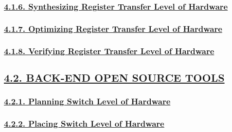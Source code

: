 \documentclass[
]{article}
\begin{document}
\hypertarget{synthesizing-register-transfer-level-of-hardware}{%
\subsubsection{\texorpdfstring{\protect\hyperlink{synthesizing-register-transfer-level-of-hardware-1}{4.1.6.
Synthesizing Register Transfer Level of
Hardware}}{4.1.6. Synthesizing Register Transfer Level of Hardware}}\label{synthesizing-register-transfer-level-of-hardware}}

\hypertarget{optimizing-register-transfer-level-of-hardware}{%
\subsubsection{\texorpdfstring{\protect\hyperlink{optimizing-register-transfer-level-of-hardware-1}{4.1.7.
Optimizing Register Transfer Level of
Hardware}}{4.1.7. Optimizing Register Transfer Level of Hardware}}\label{optimizing-register-transfer-level-of-hardware}}

\hypertarget{verifying-register-transfer-level-of-hardware}{%
\subsubsection{\texorpdfstring{\protect\hyperlink{verifying-register-transfer-level-of-hardware-1}{4.1.8.
Verifying Register Transfer Level of
Hardware}}{4.1.8. Verifying Register Transfer Level of Hardware}}\label{verifying-register-transfer-level-of-hardware}}

\hypertarget{back-end-open-source-tools}{%
\subsection{\texorpdfstring{\protect\hyperlink{back-end-open-source-tools-2}{4.2.
BACK-END OPEN SOURCE
TOOLS}}{4.2. BACK-END OPEN SOURCE TOOLS}}\label{back-end-open-source-tools}}

\hypertarget{planning-switch-level-of-hardware}{%
\subsubsection{\texorpdfstring{\protect\hyperlink{planning-switch-level-of-hardware-1}{4.2.1.
Planning Switch Level of
Hardware}}{4.2.1. Planning Switch Level of Hardware}}\label{planning-switch-level-of-hardware}}

\hypertarget{placing-switch-level-of-hardware}{%
\subsubsection{\texorpdfstring{\protect\hyperlink{placing-switch-level-of-hardware-1}{4.2.2.
Placing Switch Level of
Hardware}}{4.2.2. Placing Switch Level of Hardware}}\label{placing-switch-level-of-hardware}}
\end{document}

